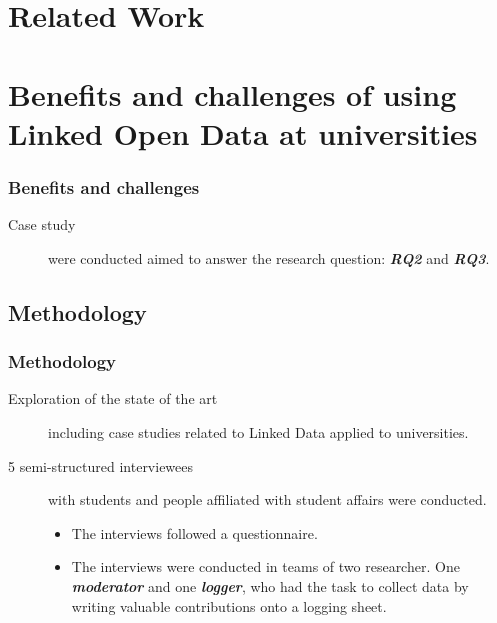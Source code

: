 \documentclass{beamer}
\begin{document}
\section[Related Work]{Related Work}



\section[Benefits and challenges]{Benefits and challenges of using Linked Open Data at universities}
\begin{frame}
\frametitle{Benefits and challenges}
\begin{description}
	\item[Case study] were conducted aimed to answer the research question: \textbf{\textit{RQ2}} and \textbf{\textit{RQ3}}.
\end{description}
\end{frame}

\subsection[Methodology]{Methodology}
\begin{frame}
\frametitle{Methodology}
\begin{description}
	\item[Exploration of the state of the art] including case studies related to Linked Data applied to universities. 
	\item[5 semi-structured interviewees] with students and people affiliated with student affairs were conducted.
	\begin{itemize}
		\item The interviews followed a questionnaire.
		\item The interviews were conducted in teams of two researcher. One \textit{\textbf{moderator}} and one \textit{\textbf{logger}}, who had the task to collect data by writing valuable contributions onto a logging sheet.
	\end{itemize}
\end{description}
\end{frame}
\end{document}
